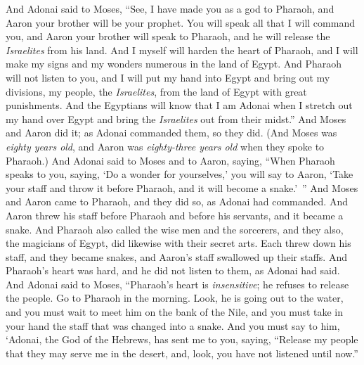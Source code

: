 \begin{biblechapter} %
 And Adonai said to Moses, “See, I have made you as a god to Pharaoh, and Aaron your brother will be your prophet.
\verse You will speak all that I will command you, and Aaron your brother will speak to Pharaoh, and he will release the \textit{Israelites} from his land.
\verse And I myself will harden the heart of Pharaoh, and I will make my signs and my wonders numerous in the land of Egypt.
\verse And Pharaoh will not listen to you, and I will put my hand into Egypt and bring out my divisions, my people, the \textit{Israelites}, from the land of Egypt with great punishments.
\verse And the Egyptians will know that I am Adonai when I stretch out my hand over Egypt and bring the \textit{Israelites} out from their midst.”
\verse And Moses and Aaron did it; as Adonai commanded them, so they did.
\verse (And Moses was \textit{eighty years old}, and Aaron was \textit{eighty-three years old} when they spoke to Pharaoh.)
 And Adonai said to Moses and to Aaron, saying,
\verse “When Pharaoh speaks to you, saying, ‘Do a wonder for yourselves,’ you will say to Aaron, ‘Take your staff and throw it before Pharaoh, and it will become a snake.’ ”
\verse And Moses and Aaron came to Pharaoh, and they did so, as Adonai had commanded. And Aaron threw his staff before Pharaoh and before his servants, and it became a snake.
\verse And Pharaoh also called the wise men and the sorcerers, and they also, the magicians of Egypt, did likewise with their secret arts.
\verse Each threw down his staff, and they became snakes, and Aaron’s staff swallowed up their staffs.
\verse And Pharaoh’s heart was hard, and he did not listen to them, as Adonai had said.
 And Adonai said to Moses, “Pharaoh’s heart is \textit{insensitive}; he refuses to release the people.
\verse Go to Pharaoh in the morning. Look, he is going out to the water, and you must wait to meet him on the bank of the Nile, and you must take in your hand the staff that was changed into a snake.
\verse And you must say to him, ‘Adonai, the God of the Hebrews, has sent me to you, saying, “Release my people that they may serve me in the desert, and, look, you have not listened until now.”

\end{biblechapter}
